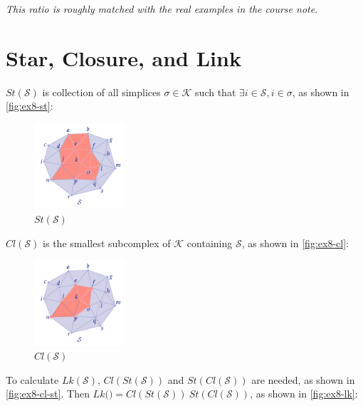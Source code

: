 \emph{This ratio is roughly matched with the real examples in the course note.}

\section{Star, Closure, and Link}

$St(\mathcal S)$ is collection of all simplices $\sigma \in \mathcal K$ such that $\exists i \in \mathcal S, i \in \sigma$, as shown in \autoref{fig:ex8-st}:

\begin{figure}[h]
    \centering
    \includegraphics[width=0.3\textwidth]{figures/A0/ex8-st.png}
    \caption{$St(\mathcal S)$}
    \label{fig:ex8-st}
\end{figure}

$Cl(\mathcal S)$ is the smallest subcomplex of $\mathcal K$ containing $\mathcal S$, as shown in \autoref{fig:ex8-cl}:

\begin{figure}[h]
    \centering
    \includegraphics[width=0.3\textwidth]{figures/A0/ex8-cl.png}
    \caption{$Cl(\mathcal S)$}
    \label{fig:ex8-cl}
\end{figure}

To calculate $Lk(\mathcal S)$, $Cl(St(\mathcal S))$ and $St(Cl(\mathcal S))$ are needed, as shown in \autoref{fig:ex8-cl-st}. Then $Lk(\mathcal) = Cl(St(\mathcal S)) \ St(Cl(\mathcal S))$, as shown in \autoref{fig:ex8-lk}:

